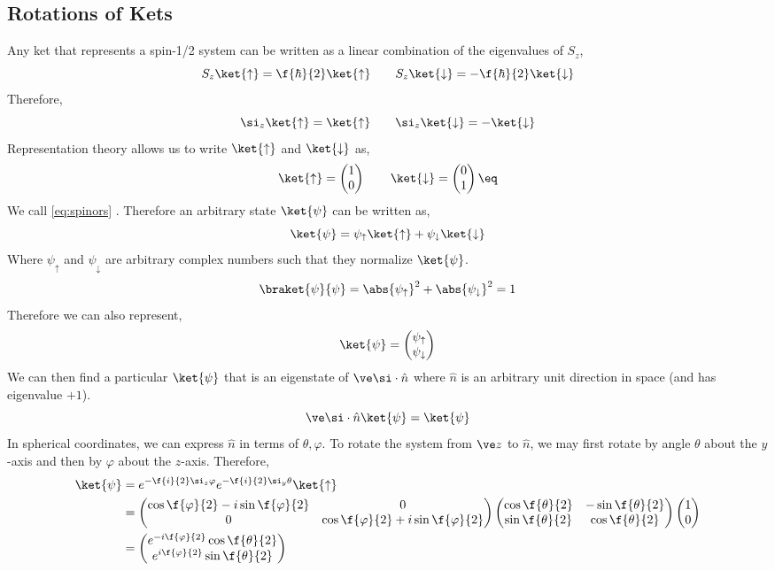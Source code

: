 \documentclass{article}
\begin{document}
\subsection{Rotations of Kets}
Any ket that represents a spin-1/2 system can be written as a linear combination of the eigenvalues of $S_z$,
\[ S_z \ket{\uparrow} = \f{\hbar}{2} \ket{\uparrow} \qquad S_z \ket{\downarrow} = -\f{\hbar}{2} \ket{\downarrow} \]
Therefore,
\[ \si_z \ket{\uparrow} =  \ket{\uparrow} \qquad \si_z \ket{\downarrow} = - \ket{\downarrow} \]
Representation theory allows us to write $\ket{\uparrow}$ and $\ket{\downarrow}$ as,
\[ \ket{\uparrow} = \begin{pmatrix}1\\0\end{pmatrix} \qquad \ket{\downarrow} = \begin{pmatrix}0\\1\end{pmatrix} \eq \label{eq:spinors} \]
We call \cref{eq:spinors} . Therefore an arbitrary state $\ket{\psi}$ can be written as,
\[ \ket{\psi} = \psi_\uparrow \ket{\uparrow} + \psi_{\downarrow} \ket{\downarrow} \]
Where $\psi_\uparrow$ and $\psi_\downarrow$ are arbitrary complex numbers such that they normalize $\ket{\psi}$.
\[ \braket{\psi}{\psi} = \abs{\psi_\uparrow}^2 + \abs{\psi_\downarrow}^2 = 1 \]
Therefore we can also represent,
\[ \ket{\psi} = \begin{pmatrix}\psi_\uparrow \\ \psi_\downarrow  \end{pmatrix} \]
We can then find a particular $\ket{\psi}$ that is an eigenstate of $\ve \si \cdot \hat n$ where $\hat n$ is an arbitrary unit direction in space (and has eigenvalue $+1$).
\[ \ve \si \cdot \hat n \ket{\psi} =  \ket{\psi} \]
In spherical coordinates, we can express $\hat n$ in terms of $\theta, \varphi$. To rotate the system from $\ve z$ to $\hat n$, we may first rotate by angle $\theta$ about the $y$-axis and then by $\varphi$ about the $z$-axis. Therefore,
\begin{align*}
    \ket{\psi}
    &= e^{-\f{i}{2} \si_z \varphi} e^{-\f{i}{2} \si_y \theta} \ket{\uparrow} \\
    &= \begin{pmatrix} \cos \f{\varphi}{2} - i \sin \f{\varphi}{2} & 0 \\ 0 & \cos \f{\varphi}{2} + i \sin \f{\varphi}{2} \end{pmatrix}\begin{pmatrix} \cos \f{\theta}{2} & -\sin \f{\theta}{2} \\ \sin \f{\theta}{2} & \cos \f{\theta}{2} \end{pmatrix} \begin{pmatrix}1\\0\end{pmatrix} \\
    &= \begin{pmatrix} e^{-i \f{\varphi}{2}}\cos \f{\theta}{2} \\ e^{i \f{\varphi}{2}}\sin \f{\theta}{2} \end{pmatrix}
\end{align*}
\end{document}
